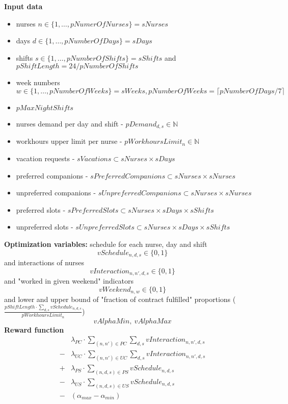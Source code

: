 \documentclass{article}
\newcommand{\N}{\mathbb{N}}
\begin{document}
\noindent \textbf{Input data}
\begin{itemize}
    \item nurses $n\in \{1, \dots, pNumerOfNurses\} = sNurses$
    \item days $d\in \{1, \dots, pNumberOfDays\} = sDays$
    \item shifts $s\in \{1, \dots, pNumberOfShifts\} = sShifts$ and $pShiftLength = 24/pNumberOfShifts$
    \item week numbers $w\in\{1, \dots, pNumberOfWeeks\} = sWeeks, pNumberOfWeeks=\lceil pNumberOfDays/7 \rceil$
    \item $pMaxNightShifts$
    \item nurses demand per day and shift - $pDemand_{d,s} \in \N$
    \item workhours upper limit per nurse - $pWorkhoursLimit_n \in \N$
    \item vacation requests - $sVacations \subset sNurses \times sDays$
    \item preferred companions - $sPreferredCompanions \subset sNurses \times sNurses$
    \item unpreferred companions - $sUnpreferredCompanions \subset sNurses \times sNurses$
    \item preferred slots - $sPreferredSlots \subset sNurses \times sDays \times sShifts$
    \item unpreferred slots - $sUnpreferredSlots \subset sNurses \times sDays \times sShifts$
\end{itemize}
\textbf{Optimization variables:} schedule for each nurse, day and shift 
$$vSchedule_{n,d,s} \in \{0,1\}$$
and interactions of nurses
$$vInteraction_{n,n',d,s} \in \{0,1\}$$
and "worked in given weekend" indicators
$$vWeekend_{n, w} \in \{0, 1\}$$
and lower and upper bound of "fraction of contract fulfilled" proportions ($\frac{pShiftLength\cdot\sum_{d,s}vSchedule_{n,d,s}}{pWorkhoursLimit_n}$)
$$vAlphaMin,\ vAlphaMax$$
\textbf{Reward function}
\begin{align*}
     &\lambda_{PC}\cdot\sum_{(n, n')\in PC}\sum_{d,s} vInteraction_{n,n',d,s} \\
    -&\lambda_{UC}\cdot\sum_{(n, n')\in UC}\sum_{d,s} vInteraction_{n,n',d,s} \\ 
    +&\lambda_{PS}\cdot\sum_{(n, d, s)\in PS} vSchedule_{n,d,s} \\ 
    -&\lambda_{US}\cdot\sum_{(n, d, s)\in US} vSchedule_{n,d,s} \\
    -&(\alpha_{max} - \alpha_{min})%
\end{align*}
\end{document}
